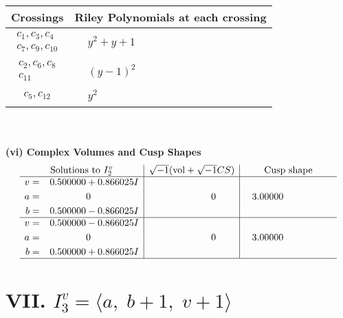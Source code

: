 \documentclass[1p]{elsarticle_modified}
\theoremstyle{definition}
\newcommand{\I}{\sqrt{-1}}
\begin{document}
\begin{tabular}{m{50pt}|m{274pt}}
Crossings & \hspace{64pt}Riley Polynomials at each crossing \\
\hline $$\begin{aligned}c_{1},c_{3},c_{4}\\c_{7},c_{9},c_{10}\end{aligned}$$&$\begin{aligned}
&y^2+y+1
\end{aligned}$\\
\hline $$\begin{aligned}c_{2},c_{6},c_{8}\\c_{11}\end{aligned}$$&$\begin{aligned}
&(y-1)^2
\end{aligned}$\\
\hline $$\begin{aligned}c_{5},c_{12}\end{aligned}$$&$\begin{aligned}
&y^2
\end{aligned}$\\
\hline
\end{tabular}\\~\\
\newpage\flushleft \textbf{(vi) Complex Volumes and Cusp Shapes}
$$\begin{array}{c|c|c}  
\text{Solutions to }I^v_{2}& \I (\text{vol} + \sqrt{-1}CS) & \text{Cusp shape}\\
 \hline 
\begin{aligned}
v &= \phantom{-}0.500000 + 0.866025 I \\
a &= \phantom{-0.000000 } 0 \\
b &= \phantom{-}0.500000 - 0.866025 I\end{aligned}
 & \phantom{-0.000000 } 0 & \phantom{-}3.00000\phantom{ +0.000000I} \\ \hline\begin{aligned}
v &= \phantom{-}0.500000 - 0.866025 I \\
a &= \phantom{-0.000000 } 0 \\
b &= \phantom{-}0.500000 + 0.866025 I\end{aligned}
 & \phantom{-0.000000 } 0 & \phantom{-}3.00000\phantom{ +0.000000I}\\
 \hline 
 \end{array}$$\newpage\newpage\renewcommand{\arraystretch}{1}
\centering \section*{VII. $I^v_{3}= \langle a,\;b+1,\;v+1 \rangle$}
\end{document}
